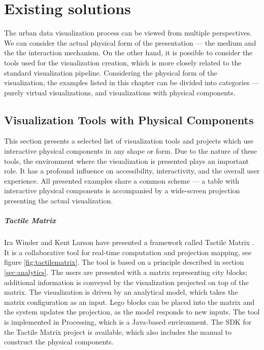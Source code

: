 \chapter{Existing solutions}
\label{chapter:solutions}
The urban data visualization process can be viewed from multiple perspectives. We can consider the actual physical form of the presentation --- the medium and the the interaction mechanism. On the other hand, it is possible to consider the tools used for the visualization creation, which is more closely related to the standard visualization pipeline. Considering the physical form of the visualization, the examples listed in this chapter can be divided into categories --- purely virtual visualizations, and visualizations with physical components.

\section{Visualization Tools with Physical Components}
This section presents a selected list of visualization tools and projects which use interactive physical components in any shape or form. Due to the nature of these tools, the environment where the visualization is presented plays an important role. It has a profound influence on accessibility, interactivity, and the overall user experience. All presented examples share a common scheme --- a table with interactive physical components is accompanied by a wide-screen projection presenting the actual visualization.   

\paragraph{Tactile Matrix}
Ira Winder and Kent Larson have presented a framework called Tactile Matrix \cite{winderTangible2017}. It is a collaborative tool for real-time computation and projection mapping, see figure \ref{fig:tactilematrix}. The tool is based on a principle described in section \ref{sec:analytics}. The users are presented with a matrix representing city blocks; additional information is conveyed by the visualization projected on top of the matrix. The visualization is driven by an analytical model, which takes the matrix configuration as an input. Lego blocks can be placed into the matrix and the system updates the projection, as the model responds to new inputs. The tool is implemented in Processing, which is a Java-based environment. The SDK for the Tactile Matrix project is available, which also includes the manual to construct the physical components.

